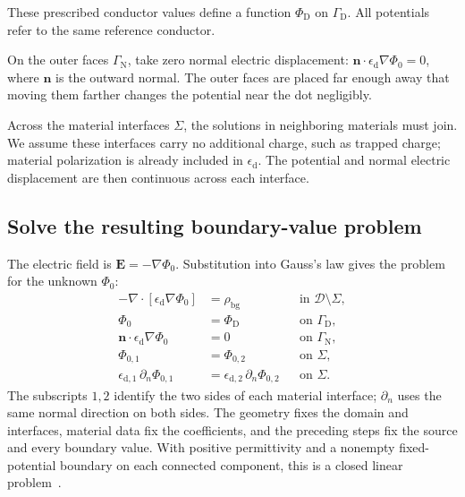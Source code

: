 These prescribed conductor values define a function $\Phi_{\mathrm D}$
on $\Gamma_{\mathrm D}$. All potentials refer to the same reference
conductor.

On the outer faces $\Gamma_{\mathrm N}$, take zero normal electric
displacement:
$\mathbf n\cdot\epsilon_{\mathrm d}\nabla\Phi_0=0$,
where $\mathbf n$ is the outward normal. The outer faces are placed
far enough away that moving them farther changes the potential
near the dot negligibly.

Across the material interfaces $\Sigma$, the solutions in neighboring
materials must join. We assume these interfaces carry no additional charge,
such as trapped charge; material polarization is already included
in $\epsilon_{\mathrm d}$. The potential and normal electric
displacement are then continuous across each interface.

\subsection{Solve the resulting boundary-value problem}
The electric field is $\mathbf E=-\nabla\Phi_0$. Substitution
into Gauss's law gives the problem for the unknown $\Phi_0$:
\begin{equation}
 \begin{aligned}
 -\nabla\cdot[\epsilon_{\mathrm d}\nabla\Phi_0]
       &=\rho_{\mathrm{bg}}
            &&\text{in }\mathcal D\setminus\Sigma,\\
 \Phi_0&=\Phi_{\mathrm D}
            &&\text{on }\Gamma_{\mathrm D},\\
 \mathbf n\cdot\epsilon_{\mathrm d}\nabla\Phi_0&=0
            &&\text{on }\Gamma_{\mathrm N},\\
 \Phi_{0,1}&=\Phi_{0,2}
            &&\text{on }\Sigma,\\
 \epsilon_{\mathrm d,1}\,\partial_n\Phi_{0,1}
       &=\epsilon_{\mathrm d,2}\,\partial_n\Phi_{0,2}
            &&\text{on }\Sigma.
 \end{aligned}
\label{eq:device-poisson}
\end{equation}
The subscripts $1,2$ identify the two sides of each material
interface; $\partial_n$ uses the same normal direction on both sides.
The geometry fixes the domain and interfaces, material data
fix the coefficients, and the preceding steps fix the source
and every boundary value. With positive permittivity and a
nonempty fixed-potential boundary on each connected component,
this is a closed linear problem~\cite{QTCADPoisson}.

